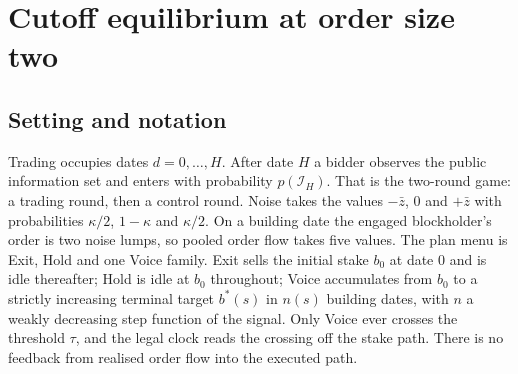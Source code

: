 
\providecommand{\Eop}{\mathbb{E}}
\providecommand{\Prb}{\mathbb{P}}
\providecommand{\ind}{\mathbf{1}}
\providecommand{\Tmap}{\mathsf{T}}

\makeatletter
{}
\makeatother

\section{Cutoff equilibrium at order size two}
\label{sec:pf-existence}

\subsection*{Setting and notation}
\label{sec:pf-existence-setup}

Trading occupies dates $d=0,\ldots,H$. After date $H$ a bidder observes the public information set
and enters with probability $p(\mathcal I_H)$. That is the two-round game: a trading round, then a
control round. Noise takes the values $-\bar z$, $0$ and $+\bar z$ with probabilities $\kappa/2$,
$1-\kappa$ and $\kappa/2$. On a building date the engaged blockholder's order is two noise lumps, so
pooled order flow takes five values. The plan menu is Exit, Hold and one Voice family. Exit sells
the initial stake $b_0$ at date $0$ and is idle thereafter; Hold is idle at $b_0$ throughout; Voice
accumulates from $b_0$ to a strictly increasing terminal target $b^*(s)$ in $n(s)$ building dates,
with $n$ a weakly decreasing step function of the signal. Only Voice ever crosses the threshold
$\tau$, and the legal clock reads the crossing off the stake path. There is no feedback from
realised order flow into the executed path.

